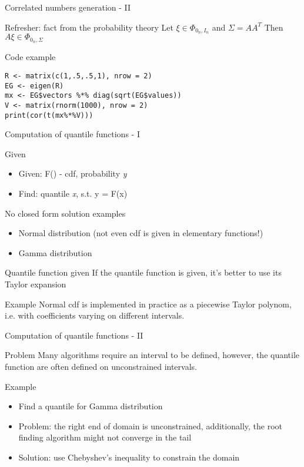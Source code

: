 \documentclass[presentation]{beamer}
\begin{document}
\begin{frame}[fragile,label=sec-3-2]{Correlated numbers generation - II}
 \begin{block}{Refresher: fact from the probability theory}
Let $\xi \in \Phi_{0_n, I_n}$ and $\Sigma = AA^T$
Then $A\xi \in \Phi_{0_n, \Sigma}$
\end{block}
\begin{block}{Code example}
\begin{verbatim}
R <- matrix(c(1,.5,.5,1), nrow = 2)
EG <- eigen(R)
mx <- EG$vectors %*% diag(sqrt(EG$values))
V <- matrix(rnorm(1000), nrow = 2)
print(cor(t(mx%*%V)))
\end{verbatim}
\end{block}
\end{frame}
\begin{frame}[label=sec-3-3]{Computation of quantile functions - I}
\begin{block}{Given}
\begin{itemize}
\item Given: F() - cdf, probability \emph{y}
\item Find: quantile \emph{x}, s.t. y = F(x)
\end{itemize}
\end{block}
\begin{block}{No closed form solution examples}
\begin{itemize}
\item Normal distribution (not even cdf is given in elementary functions!)
\item Gamma distribution
\end{itemize}
\end{block}
\begin{block}{Quantile function given}
If the quantile function is given, it's better to use its Taylor expansion
\end{block}
\begin{block}{Example}
Normal cdf is implemented in practice as a piecewise Taylor polynom, i.e. with coefficients varying on different intervals.
\end{block}
\end{frame}
\begin{frame}[label=sec-3-4]{Computation of quantile functions - II}
\begin{block}{Problem}
Many algorithms require an interval to be defined, however, the quantile function are often defined on unconstrained intervals.
\end{block}
\begin{block}{Example}
\begin{itemize}
\item Find a quantile for Gamma distribution
\item Problem: the right end of domain is unconstrained, additionally, the root finding algorithm might not converge in the tail
\item Solution: use Chebyshev's inequality to constrain the domain
\end{itemize}
\end{block}
\end{frame}
\end{document}
